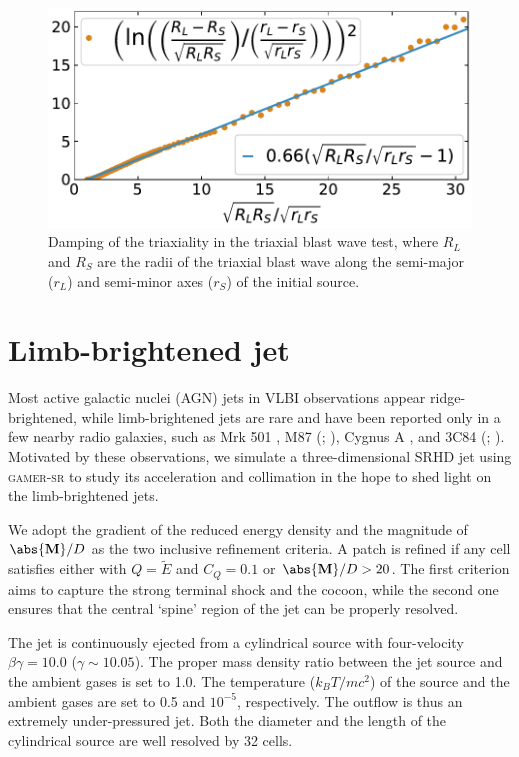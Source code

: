 \begin{figure}
\includegraphics[width=\linewidth]{figures/fig__AxesRatio.pdf}
\caption{Damping of the triaxiality in the triaxial blast wave test, where $R_{L}$ and $R_{S}$ are the radii of the triaxial blast wave along the semi-major ($r_{L}$) and semi-minor axes ($r_{S}$) of the initial source.}
\label{fig:BlastFitting}
\end{figure}

\section{Limb-brightened jet}
\label{Limb-brightened jet}
Most active galactic nuclei (AGN) jets in VLBI observations appear ridge-brightened, while limb-brightened jets are rare and have been reported only in a few nearby radio galaxies, such as Mrk 501 \citep{Giroletti2004}, M87 (\citealt{Asada2012}; \citealt{Kim2018}), Cygnus A \citep{Boccardi2015}, and 3C84 (\citealt{Nagai_2014}; \citealt{Giovannini2018}). Motivated by these observations, we simulate a three-dimensional SRHD jet using \textsc{gamer-sr} to study its acceleration and collimation in the hope to shed light on the limb-brightened jets.

We adopt the gradient of the reduced energy density and the magnitude of $\abs{\mathbf{M}}/D$ as the two inclusive refinement criteria. A patch is refined if any cell satisfies either  with $Q=\tilde{E}$ and $C_{Q}=0.1$ or $\abs{\mathbf{M}}/D>20$. The first criterion aims to capture the strong terminal shock and the cocoon, while the second one ensures that the central `spine' region of the jet can be properly resolved.

The jet is continuously ejected from a cylindrical source with four-velocity $\beta\gamma=10.0$ ($\gamma \sim 10.05$). The proper mass density ratio between the jet source and the ambient gases is set to 1.0. The temperature ($k_{B}T/mc^2$) of the source and the ambient gases are set to 0.5 and $10^{-5}$, respectively. The outflow is thus an extremely under-pressured jet. Both the diameter and the length of the cylindrical source are well resolved by 32 cells.

